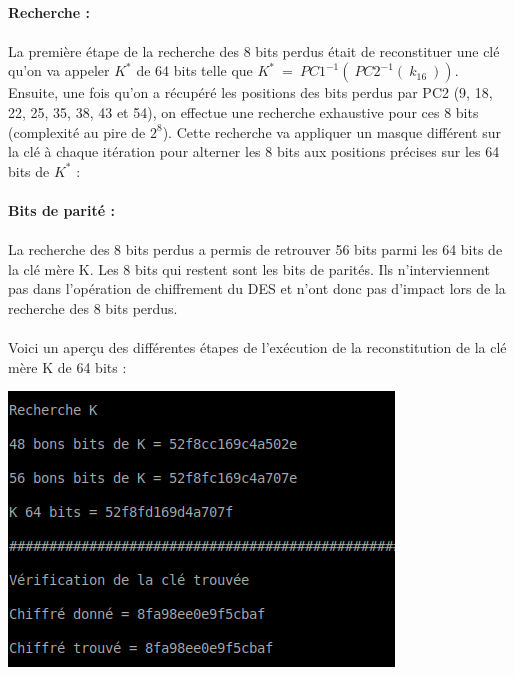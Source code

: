 			\paragraph{Recherche :} 
			\paragraph{} La première étape de la recherche des 8 bits perdus était de reconstituer une clé qu'on va appeler $K^{*}$ de 64 bits telle que $K^{*}\ =\ PC1^{-1}(\ PC2^{-1}(\ k_{16}\ ))$.\\
			\indent Ensuite, une fois qu'on a récupéré les positions des bits perdus par PC2 (9, 18, 22, 25, 35, 38, 43 et 54), on effectue une recherche exhaustive pour ces 8 bits (complexité au pire de $2^{8}$). Cette recherche va appliquer un masque différent sur la clé à chaque itération pour alterner les 8 bits aux positions précises sur les 64 bits de $K^{*}$ :
			
			
			
			\paragraph{Bits de parité :} 
			\paragraph{} La recherche des 8 bits perdus a permis de retrouver 56 bits parmi les 64 bits de la clé mère K. Les 8 bits qui restent sont les bits de parités. Ils n'interviennent pas dans l'opération de chiffrement du DES et n'ont donc pas d'impact lors de la recherche des 8 bits perdus.
			
			\paragraph{} Voici un aperçu des différentes étapes de l'exécution de la reconstitution de la clé mère K de 64 bits :
			
			\begin{center}\includegraphics[scale=1]{K.png}\end{center}
			
